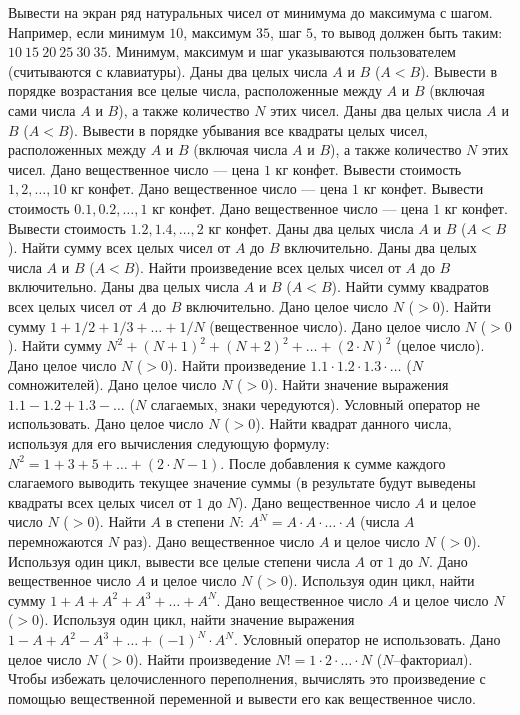 Вывести на экран ряд натуральных чисел от минимума до максимума с шагом. Например, если минимум $10$, максимум $35$, шаг $5$, то вывод должен быть таким: $10 \ 15 \ 20 \ 25 \ 30 \ 35$. Минимум, максимум и шаг указываются пользователем (считываются с клавиатуры).
Даны два целых числа $A$ и $B$ ($A < B$). Вывести в порядке возрастания все целые числа, расположенные между $A$ и $B$ (включая сами числа $A$ и $B$), а также количество $N$ этих чисел.
Даны два целых числа $A$ и $B$ ($A < B$). Вывести в порядке убывания все квадраты целых чисел, расположенных между $A$ и $B$ (включая числа $A$ и $B$), а также количество $N$ этих чисел.
Дано вещественное число --- цена $1$ кг конфет. Вывести стоимость $1, 2, \dots, 10$ кг конфет.
Дано вещественное число --- цена $1$ кг конфет. Вывести стоимость $0.1, 0.2, \dots, 1$ кг конфет.
Дано вещественное число --- цена $1$ кг конфет. Вывести стоимость $1.2, 1.4, \dots, 2$ кг конфет.
Даны два целых числа $A$ и $B$ ($A < B$). Найти сумму всех целых чисел от $A$ до $B$ включительно.
Даны два целых числа $A$ и $B$ ($A < B$). Найти произведение всех целых чисел от $A$ до $B$ включительно.
Даны два целых числа $A$ и $B$ ($A < B$). Найти сумму квадратов всех целых чисел от $A$ до $B$ включительно.
Дано целое число $N$ ($> 0$). Найти сумму $1 + 1/2 + 1/3 + \dots + 1/N$ (вещественное число).
Дано целое число $N$ ($> 0$). Найти сумму $N^2 + (N + 1)^2 + (N + 2)^2 + \dots + (2 \cdot N)^2$ (целое число).
Дано целое число $N$ ($> 0$). Найти произведение $1.1 \cdot 1.2 \cdot 1.3 \cdot \dots$ ($N$ сомножителей).
Дано целое число $N$ ($> 0$). Найти значение выражения $1.1 - 1.2 + 1.3 - \dots$ ($N$ слагаемых, знаки чередуются). Условный оператор не использовать.
Дано целое число $N$ ($> 0$). Найти квадрат данного числа, используя для его вычисления следующую формулу: $N^2 = 1 + 3 + 5 + \dots + (2 \cdot N - 1)$. После добавления к сумме каждого слагаемого выводить текущее значение суммы (в результате будут выведены квадраты всех целых чисел от $1$ до $N$).
Дано вещественное число $A$ и целое число $N$ ($> 0$). Найти $A$ в степени $N$: $A^N = A \cdot A \cdot \ldots \cdot A$ (числа $A$ перемножаются $N$ раз).
Дано вещественное число $A$ и целое число $N$ ($> 0$). Используя один цикл, вывести все целые степени числа $A$ от $1$ до $N$.
Дано вещественное число $A$ и целое число $N$ ($> 0$). Используя один цикл, найти сумму $1 + A + A^2 + A^3 + \dots + A^N$.
Дано вещественное число $A$ и целое число $N$ ($> 0$). Используя один цикл, найти значение выражения $1 - A + A^2 - A^3 + \dots + (-1)^N \cdot A^N$. Условный оператор не использовать.
Дано целое число $N$ ($> 0$). Найти произведение $N! = 1 \cdot 2 \cdot \ldots \cdot N$ ($N$--факториал). Чтобы избежать целочисленного переполнения, вычислять это произведение с помощью вещественной переменной и вывести его как вещественное число.
